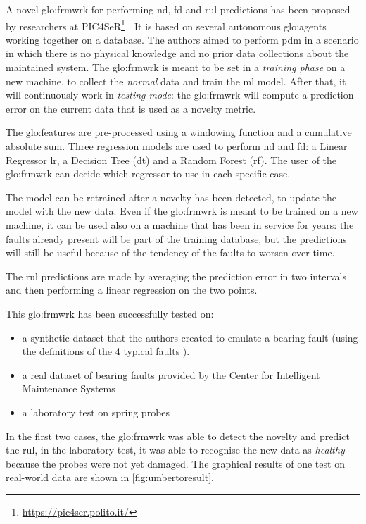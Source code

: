 A novel \gls{glo:frmwrk} for performing \gls{nd}, \gls{fd} and \gls{rul} predictions has been proposed by researchers at PIC4SeR\footnote{\url{https://pic4ser.polito.it/}} \cite{Umberto}. It is based on several autonomous \gls{glo:agent}s working together on a database.  The authors aimed to perform \gls{pdm} in a scenario in which there is no physical knowledge and no prior data collections about the maintained system. The \gls{glo:frmwrk} is meant to be set in a \emph{training phase} on a new machine, to collect the \emph{normal} data and train the \gls{ml} model. After that, it will continuously work in \emph{testing mode}: the \gls{glo:frmwrk} will compute a prediction error on the current data that is used as a novelty metric.

The \gls{glo:feature}s are pre-processed using a windowing function and a cumulative absolute sum. Three regression models are used to perform \gls{nd} and \gls{fd}: a Linear Regressor \gls{lr}, a Decision Tree (\gls{dt}) and a Random Forest (\gls{rf}). The user of the \gls{glo:frmwrk} can decide which regressor to use in each specific case. 

The model can be retrained after a novelty has been detected, to update the model with the new data. Even if the \gls{glo:frmwrk} is meant to be trained on a new machine, it can be used also on a machine that has been in service for years: the faults already present will be part of the training database, but the predictions will still be useful because of the tendency of the faults to worsen over time.

The \gls{rul} predictions are made by averaging the prediction error in two intervals and then performing a linear regression on the two points. 

This \gls{glo:frmwrk} has been successfully tested on:  
\begin{itemize}
    \item a synthetic dataset that the authors created to emulate a bearing fault (using the definitions of the 4 typical faults \cite{RollingSignature}).
    \item a real dataset of bearing faults provided by the Center for Intelligent Maintenance Systems \cite{IMSpaper}
    \item a laboratory test on spring probes
\end{itemize}

In the first two cases, the \gls{glo:frmwrk} was able to detect the novelty and predict the \gls{rul}, in the laboratory test, it was able to recognise the new data as \emph{healthy} because the probes were not yet damaged. The graphical results of one test on real-world data are shown in \autoref{fig:umbertoresult}.

